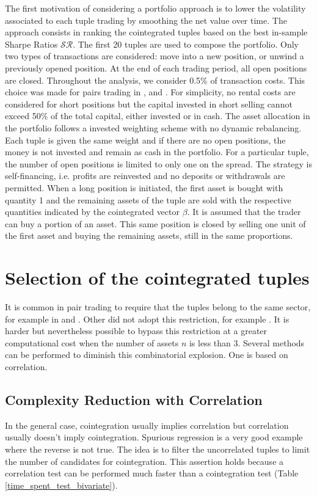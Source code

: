 \documentclass[11pt,a4,twosided,singlespacing,titlepagenumber=on]{scrreprt}
\numberwithin{equation}{chapter} %
\theoremstyle{remark}
\begin{document}
The first motivation of considering a portfolio approach is to lower the volatility associated to each tuple trading by smoothing the net value over time. The approach consists in ranking the cointegrated tuples based on the best in-sample Sharpe Ratios $\mathcal{SR}$. The first 20 tuples are used to compose the portfolio. Only two types of transactions are considered: move into a new position, or unwind a previously opened position. At the end of each trading period, all open positions are closed. Throughout the analysis, we consider 0.5\% of transaction costs. This choice was made for pairs trading in \cite{dunis2010}, \cite{dunis2005} and \cite{alexander2002}. For simplicity, no rental costs are considered for short positions but the capital invested in short selling cannot exceed 50\% of the total capital, either invested or in cash. The asset allocation in the portfolio follows a invested weighting scheme with no dynamic rebalancing. Each tuple is given the same weight and if there are no open positions, the money is not invested and remain as cash in the portfolio. For a particular tuple, the number of open positions is limited to only one on the spread. The strategy is self-financing, i.e. profits are reinvested and no deposits or withdrawals are permitted. When a long position is initiated, the first asset is bought with quantity 1 and the remaining assets of the tuple are sold with the respective quantities indicated by the cointegrated vector $\beta$. It is assumed that the trader can buy a portion of an asset. This same position is closed by selling one unit of the first asset and buying the remaining assets, still in the same proportions.

\section{Selection of the cointegrated tuples}

It is common in pair trading to require that the tuples belong to the same sector, for example in \cite{chan2009} and \cite{dunis2010}. Other did not adopt this restriction, for example \cite{caldeira2013}. It is harder but nevertheless possible to bypass this restriction at a greater computational cost when the number of assets $n$ is less than 3. Several methods can be performed to diminish this combinatorial explosion. One is based on correlation. 

\subsection{Complexity Reduction with Correlation}
\label{Complexity_Reduction_with_Correlation}
In the general case, cointegration usually implies correlation but correlation usually doesn't imply cointegration. Spurious regression is a very good example where the reverse is not true. The idea is to filter the uncorrelated tuples to limit the number of candidates for cointegration. This assertion holds because a correlation test can be performed much faster than a cointegration test (Table \ref{time_spent_test_bivariate}).
\end{document}
